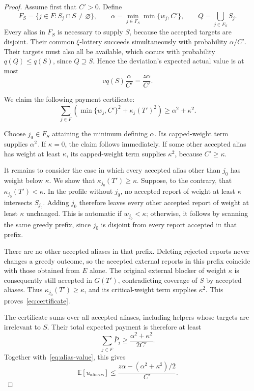 \documentclass[format=acmsmall, review=false]{acmart}
\newcommand{\E}{\mathbb{E}}
\begin{document}
\begin{proof}
Assume first that \(C'>0\). Define
\[
F_S=\{j\in F:S_j\cap S\ne\varnothing\},
\qquad
\alpha=\min_{j\in F_S}\min\{w_j,C'\},
\qquad
Q=\bigcup_{j\in F_S}S_j.
\]
Every alias in \(F_S\) is necessary to supply \(S\), because
the accepted targets are disjoint. Their common \(\xi\)-lottery
succeeds simultaneously with probability \(\alpha/C'\).
Their targets must also all be available, which occurs with
probability \(q(Q)\le q(S)\), since \(Q\supseteq S\).
Hence the deviation's expected actual value is at most
\begin{equation}\label{eq:alias-value}
v q(S)\frac{\alpha}{C'}=\frac{z\alpha}{C'}.
\end{equation}

We claim the following payment certificate:
\begin{equation}\label{eq:certificate}
\sum_{j\in F}
\left(
\min\{w_j,C'\}^2+\kappa_j(T')^2
\right)
\ge\alpha^2+\kappa^2.
\end{equation}

Choose \(j_0\in F_S\) attaining the minimum defining \(\alpha\).
Its capped-weight term supplies \(\alpha^2\). If \(\kappa=0\), the
claim follows immediately. If some other accepted alias
has weight at least \(\kappa\), its capped-weight term supplies
\(\kappa^2\), because \(C'\ge\kappa\).

It remains to consider the case in which every accepted
alias other than \(j_0\) has weight below \(\kappa\).
We show that \(\kappa_{j_0}(T')\ge\kappa\).
Suppose, to the contrary, that \(\kappa_{j_0}(T')<\kappa\).
In the profile without \(j_0\), no accepted report of weight
at least \(\kappa\) intersects \(S_{j_0}\). Adding \(j_0\) therefore
leaves every other accepted report of weight at least \(\kappa\)
unchanged. This is automatic if \(w_{j_0}<\kappa\); otherwise,
it follows by scanning the same greedy prefix, since
\(j_0\) is disjoint from every report accepted in that prefix.

There are no other accepted aliases in that prefix.
Deleting rejected reports never changes a greedy outcome,
so the accepted external reports in this prefix coincide
with those obtained from \(E\) alone. The original external
blocker of weight \(\kappa\) is consequently still accepted in
\(G(T')\), contradicting coverage of \(S\) by accepted aliases.
Thus \(\kappa_{j_0}(T')\ge\kappa\), and its critical-weight term supplies
\(\kappa^2\). This proves~\eqref{eq:certificate}.

The certificate sums over all accepted aliases, including
helpers whose targets are irrelevant to \(S\). Their total
expected payment is therefore at least
\[
\sum_{j\in F}\bar P_j
\ge\frac{\alpha^2+\kappa^2}{2C'}.
\]
Together with~\eqref{eq:alias-value}, this gives
\begin{equation}\label{eq:attack}
\E[u_{\mathrm{aliases}}]
\le
\frac{z\alpha-(\alpha^2+\kappa^2)/2}{C'}.
\end{equation}


\end{proof}
\end{document}
